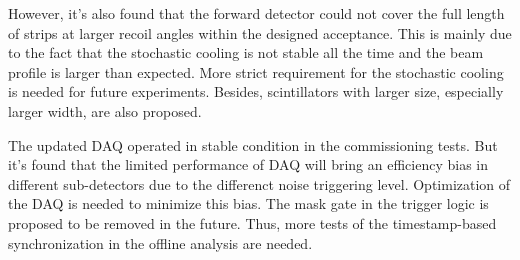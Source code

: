 \documentclass[number,5p]{elsarticle}
\begin{document}
However, it's also found that the forward detector could not cover the full
length of strips at larger recoil angles within the designed acceptance.
This is mainly due to the fact that the stochastic cooling is not stable all the time
and the beam profile is larger than expected.
More strict requirement for the stochastic cooling is needed for future experiments.
Besides, scintillators with larger size, especially larger width, are also proposed.

The updated DAQ operated in stable condition in the commissioning tests.
But it's found that the limited performance of DAQ will bring an efficiency bias in different
sub-detectors due to the differenct noise triggering level.
Optimization of the DAQ is needed to minimize this bias.
The mask gate in the trigger logic is proposed to be removed in the future.
Thus, more tests of the timestamp-based synchronization in the offline analysis are needed.



\end{document}
